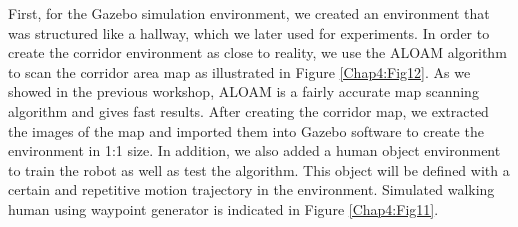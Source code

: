 First, for the Gazebo simulation environment, we created an environment 
that was structured like a hallway, which we later used for experiments. In order to 
create the corridor environment as close to reality, we use the ALOAM algorithm 
\cite{legoloam,loam} to scan the corridor area map as illustrated in Figure \ref{Chap4:Fig12}. As we showed in the previous 
workshop, ALOAM is a fairly accurate map scanning algorithm and gives fast results. 
After creating the corridor map, we extracted the images of the map and imported them 
into Gazebo software to create the environment in 1:1 size. In addition, we also added a 
human object environment to train the robot as well as test the algorithm. 
This object will be defined with a certain and repetitive motion trajectory in the environment.
Simulated walking human using waypoint generator is indicated in Figure \ref{Chap4:Fig11}.

